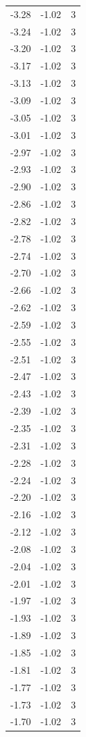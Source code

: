 \begin{longtable}{lrr}
  -3.28 & -1.02 & 3 \\
  -3.24 & -1.02 & 3 \\
  -3.20 & -1.02 & 3 \\
  -3.17 & -1.02 & 3 \\
  -3.13 & -1.02 & 3 \\
  -3.09 & -1.02 & 3 \\
  -3.05 & -1.02 & 3 \\
  -3.01 & -1.02 & 3 \\
  -2.97 & -1.02 & 3 \\
  -2.93 & -1.02 & 3 \\
  -2.90 & -1.02 & 3 \\
  -2.86 & -1.02 & 3 \\
  -2.82 & -1.02 & 3 \\
  -2.78 & -1.02 & 3 \\
  -2.74 & -1.02 & 3 \\
  -2.70 & -1.02 & 3 \\
  -2.66 & -1.02 & 3 \\
  -2.62 & -1.02 & 3 \\
  -2.59 & -1.02 & 3 \\
  -2.55 & -1.02 & 3 \\
  -2.51 & -1.02 & 3 \\
  -2.47 & -1.02 & 3 \\
  -2.43 & -1.02 & 3 \\
  -2.39 & -1.02 & 3 \\
  -2.35 & -1.02 & 3 \\
  -2.31 & -1.02 & 3 \\
  -2.28 & -1.02 & 3 \\
  -2.24 & -1.02 & 3 \\
  -2.20 & -1.02 & 3 \\
  -2.16 & -1.02 & 3 \\
  -2.12 & -1.02 & 3 \\
  -2.08 & -1.02 & 3 \\
  -2.04 & -1.02 & 3 \\
  -2.01 & -1.02 & 3 \\
  -1.97 & -1.02 & 3 \\
  -1.93 & -1.02 & 3 \\
  -1.89 & -1.02 & 3 \\
  -1.85 & -1.02 & 3 \\
  -1.81 & -1.02 & 3 \\
  -1.77 & -1.02 & 3 \\
  -1.73 & -1.02 & 3 \\
  -1.70 & -1.02 & 3 \\

\end{longtable}
